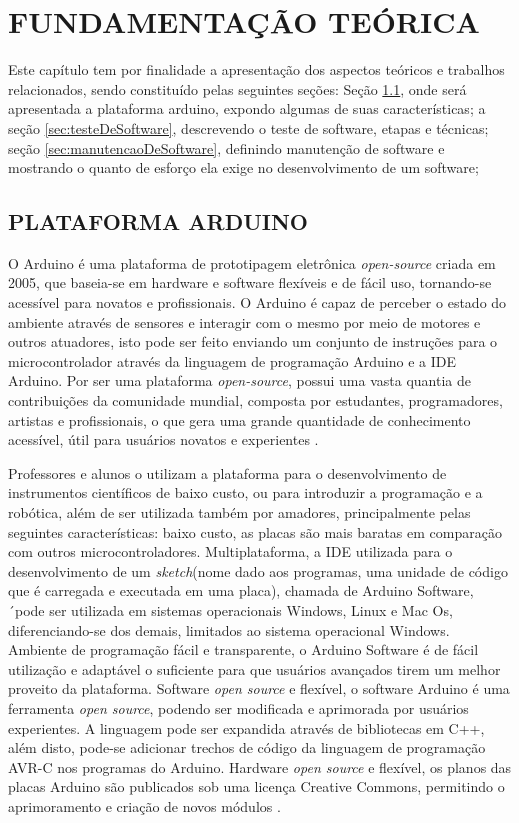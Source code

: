 
\chapter{FUNDAMENTAÇÃO TEÓRICA}
\label{chap:fundamentacao-teorica}Este capítulo tem por finalidade a apresentação dos aspectos teóricos e trabalhos relacionados, sendo constituído pelas seguintes seções: Seção \ref{sec:arduino}, onde será apresentada a plataforma arduino, expondo algumas de suas características; a seção \ref{sec:testeDeSoftware}, descrevendo o teste de software, etapas e técnicas; seção \ref{sec:manutencaoDeSoftware}, definindo manutenção de software e mostrando o quanto de esforço ela exige no desenvolvimento de um software;

\section{PLATAFORMA ARDUINO}
\label{sec:arduino} O Arduino é uma plataforma de prototipagem eletrônica \textit{open-source} criada em 2005, que baseia-se em hardware e software flexíveis e de fácil uso, tornando-se acessível para novatos e profissionais. O Arduino é capaz de perceber o estado do ambiente através de sensores e interagir com o mesmo por meio de motores e outros atuadores, isto pode ser feito enviando um conjunto de instruções para o microcontrolador através da linguagem de programação Arduino e a IDE Arduino. Por ser uma plataforma \textit{open-source}, possui uma vasta quantia de contribuições da comunidade mundial, composta por estudantes, programadores, artistas e profissionais, o que gera uma grande quantidade de conhecimento acessível, útil para usuários novatos e experientes \cite{arduino2018}.

Professores e alunos o utilizam a plataforma para o desenvolvimento de instrumentos científicos de baixo custo, ou para introduzir a programação e a robótica, além de ser utilizada também por amadores, principalmente pelas seguintes características: baixo custo, as placas são mais baratas em comparação com outros microcontroladores. Multiplataforma, a IDE utilizada para o desenvolvimento de um \textit{sketch}(nome dado aos programas, uma unidade de código que é carregada e executada em uma placa), chamada de Arduino Software, ´pode ser utilizada em sistemas operacionais Windows, Linux e Mac Os, diferenciando-se dos demais, limitados ao sistema operacional Windows. Ambiente de programação fácil e transparente, o Arduino Software é de fácil utilização e adaptável o suficiente para que usuários avançados tirem um melhor proveito da plataforma. Software \textit{open source} e flexível, o software Arduino é uma ferramenta \textit{open source}, podendo ser modificada e aprimorada por usuários experientes. A linguagem pode ser expandida através de bibliotecas em C++, além disto, pode-se adicionar trechos de código da linguagem de programação AVR-C nos programas do Arduino. Hardware \textit{open source} e flexível, os planos das placas Arduino são publicados sob uma licença Creative Commons, permitindo o aprimoramento e criação de novos módulos \cite{arduino2018}.


